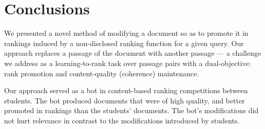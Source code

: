 \section{Conclusions}
We presented a novel method of modifying a document so as to promote it in rankings induced by a non-disclosed
ranking function for a given query. Our approach 
replaces a passage of the document with another passage --- a challenge we address as a learning-to-rank task over
passage pairs with a dual-objective: rank promotion and content-quality (coherence) maintenance.

Our approach served as a bot in content-based ranking competitions
between students. The bot produced documents that were of high
quality, and better promoted in rankings than the
students' documents. The bot's modifications did not hurt relevance in contrast to the modifications introduced by students. 


